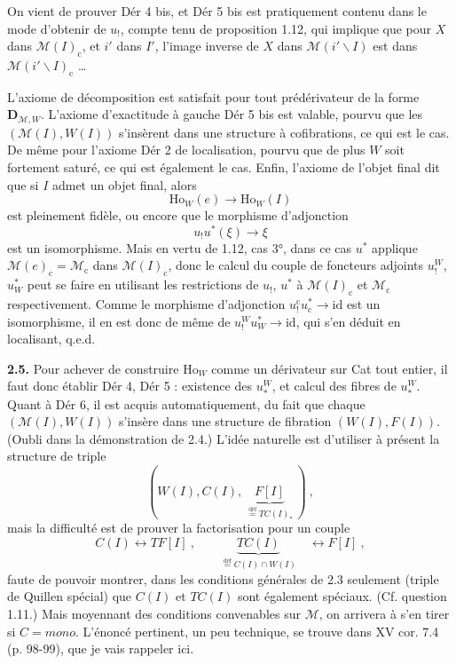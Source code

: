 \documentclass[11pt]{article}
\newcommand{\printedpage}[1]{\marginpar{\footnotesize p.~#1}}
\newcommand{\msp}[1]{\marginpar{\footnotesize [#1]}}
\newcommand{\M}{\mathcal{M}}
\newcommand{\Ho}{\mathrm{Ho}}
\newcommand{\cc}{\mathrm{c}}
\newcommand{\deq}{\overset{\text{déf}}{=}}
\begin{document}
On vient de prouver Dér 4 bis, et Dér 5 bis est pratiquement contenu dans le mode d'obtenir de $u_!$, compte tenu de proposition 1.12, qui implique que pour $X$ dans $\M(I)_{\cc}$, et $i'$ dans $I'$, l'image inverse de $X$ dans $\M(i'\backslash I)$ est dans $\M(i'\backslash I)_{\cc}$ \dots

\printedpage{14}

\msp{page 23}
L'axiome de décomposition est satisfait pour tout prédérivateur de la forme $\mathbf{D}_{\mathcal{M},W}$. L'axiome d'exactitude à gauche Dér 5 bis est valable, pourvu que les $(\mathcal{M}(I),W(I))$ s'insèrent dans une structure à cofibrations, ce qui est le cas. De même pour l'axiome Dér 2 de localisation, pourvu que de plus $W$ soit fortement saturé, ce qui est également le cas. Enfin, l'axiome de l'objet final dit que si $I$ admet un objet final, alors
\[ \Ho_W(e) \longrightarrow \Ho_W(I) \]
est pleinement fidèle, ou encore que le morphisme d'adjonction
\[ u_!u^*(\xi) \longrightarrow \xi \]
est un isomorphisme. Mais en vertu de 1.12, cas 3°, dans ce cas $u^*$ applique $\mathcal{M}(e)_{\mathrm{c}} = \mathcal{M}_{\mathrm{c}}$ dans $\mathcal{M}(I)_{\mathrm{c}}$, donc le calcul du couple de foncteurs adjoints $u_!^W$, $u_W^*$ peut se faire en utilisant les restrictions de $u_!$, $u^*$ à $\mathcal{M}(I)_{\mathrm{c}}$ et $\mathcal{M}_{\mathrm{c}}$ respectivement. Comme le morphisme d'adjonction $u_!^{\mathrm{c}}u_{\mathrm{c}}^* \longrightarrow \mathrm{id}$ est un isomorphisme, il en est donc de même de $u_!^W u_W^* \longrightarrow \mathrm{id}$, qui s'en déduit en localisant, q.e.d.

\textbf{2.5.} Pour achever de construire $\Ho_W$ comme un dérivateur sur Cat tout entier, il faut \msp{page 24} donc établir Dér 4, Dér 5 : existence des $u_*^W$, et calcul des fibres de $u_*^W$. Quant à Dér 6, il est acquis automatiquement, du fait que chaque $(\mathcal{M}(I),W(I))$ s'insère dans une structure de fibration $(W(I),F(I))$. (Oubli dans la démonstration de 2.4.) L'idée naturelle est d'utiliser à présent la structure de triple
\[ (W(I),C(I),\ \underbrace{F[I]}_{\deq TC(I)_*}\ )\ , \tag*{(2.5.1)} \]
mais la difficulté est de prouver la factorisation pour un couple
\[ C(I) \longleftrightarrow TF[I]\ , \qquad \underbrace{TC(I)}_{\deq C(I)\cap W(I)} \quad \longleftrightarrow F[I]\ , \tag*{(2.5.2)} \]
faute de pouvoir montrer, dans les conditions générales de 2.3 seulement (triple de Quillen spécial) que $C(I)$ et $TC(I)$ sont également spéciaux. (Cf. question 1.11.) Mais moyennant des conditions convenables sur $\mathcal{M}$, on arrivera à s'en tirer si $C = \mathit{mono}$. L'énoncé pertinent, un peu technique, se trouve dans XV cor. 7.4 (p. 98-99), que je vais rappeler ici.
\end{document}
